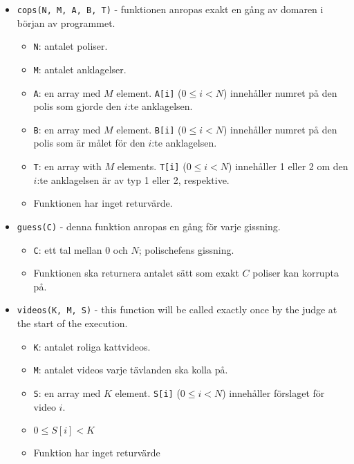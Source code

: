 \begin{itemize}
  \item \texttt{cops(N, M, A, B, T)} - funktionen anropas exakt en gång av domaren i början av programmet.
  \begin{itemize}
    \item \texttt{N}: antalet poliser.
    \item \texttt{M}: antalet anklagelser.
    \item \texttt{A}: en array med $M$ element. \texttt{A[i]} ($0 \le i < N$) innehåller numret på den polis som gjorde den $i$:te anklagelsen.
    \item \texttt{B}: en array med $M$ element. \texttt{B[i]} ($0 \le i < N$) innehåller numret på den polis som är målet för den $i$:te anklagelsen.
    \item \texttt{T}: en array with $M$ elements. \texttt{T[i]} ($0 \le i < N$) innehåller 1 eller 2 om den $i$:te anklagelsen är av typ 1 eller 2, respektive.
		\item Funktionen har inget returvärde.
  \end{itemize}
\end{itemize}

\begin{itemize}
  \item \texttt{guess(C)} - denna funktion anropas en gång för varje gissning.
  \begin{itemize}
    \item \texttt{C}: ett tal mellan $0$ och $N$; polischefens gissning.
		\item Funktionen ska returnera antalet sätt som exakt $C$ poliser kan korrupta på.
  \end{itemize}
\end{itemize}

\begin{itemize}
  \item \texttt{videos(K, M, S)} - this function will be called exactly once by the judge at the start of the execution.
  \begin{itemize}
    \item \texttt{K}: antalet roliga kattvideos.
    \item \texttt{M}: antalet videos varje tävlanden ska kolla på.
    \item \texttt{S}: en array med $K$ element. \texttt{S[i]} ($0 \le i < N$) innehåller förslaget för video $i$.
		\item $0 \le S[i] < K$
    \item Funktion har inget returvärde
  \end{itemize}
\end{itemize}

